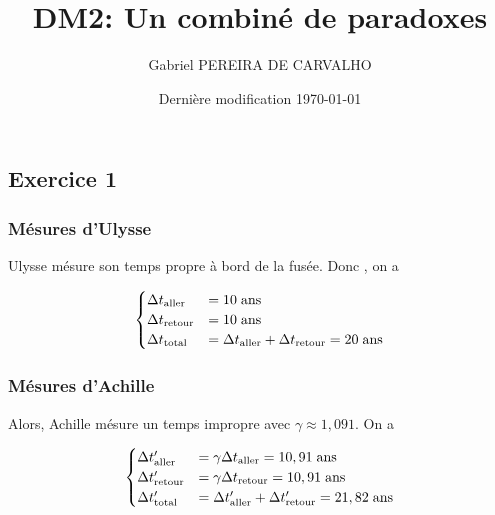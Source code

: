 \documentclass[french]{article}
\begin{document}
	\title{DM2: Un combiné de paradoxes}
	\author{Gabriel PEREIRA DE CARVALHO}
	\date{Dernière modification \today}
	
	\maketitle
	
	\subsection*{Exercice 1}
	
	\subsubsection*{Mésures d'Ulysse}
	
	Ulysse mésure son temps propre à bord de la fusée. Donc , on a
	
	\begin{align}
		\begin{cases}
		\Delta t_{\mathrm{aller}} &= 10 \hspace{0.1cm} \mathrm{ans}\\
		\Delta t_{\mathrm{retour}} &= 10 \hspace{0.1cm}  \mathrm{ans}\\
		\Delta t_{\mathrm{total}} &= \Delta t_{\mathrm{aller}} + \Delta t_{\mathrm{retour}} = 20 \hspace{0.1cm} \mathrm{ans}
		\end{cases}
	\end{align}
	
	\subsubsection*{Mésures d'Achille}
	
	Alors, Achille mésure un temps impropre avec $\gamma \approx 1,091$. On a
	
	\begin{align}
	\begin{cases}
	\Delta t'_{\mathrm{aller}} &= \gamma \Delta t_{\mathrm{aller}} =  10,91 \hspace{0.1cm} \mathrm{ans}\\
	\Delta t'_{\mathrm{retour}} &= \gamma \Delta t_{\mathrm{retour}} =  10,91 \hspace{0.1cm} \mathrm{ans}\\
	\Delta t'_{\mathrm{total}} &= \Delta t'_{\mathrm{aller}} + \Delta t'_{\mathrm{retour}} = 21,82 \hspace{0.1cm} \mathrm{ans}
	\end{cases}
	\end{align}
	
\end{document}
